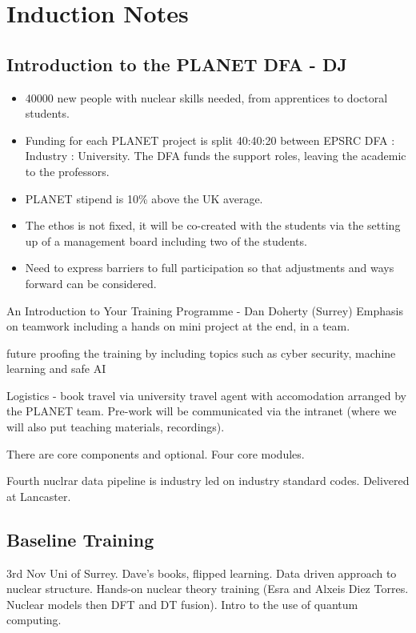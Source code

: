 \chapter{Induction Notes}
\section{Introduction to the PLANET DFA - DJ}
\begin{itemize}
    \item 40000 new people with nuclear skills needed, from apprentices to doctoral students.
    \item Funding for each PLANET project is split 40:40:20 between EPSRC DFA : Industry : University. The DFA funds the support roles, leaving the academic to the professors. 
    \item PLANET stipend is 10\% above the UK average.
    \item The ethos is not fixed, it will be co-created with the students via the setting up of a management board including two of the students. 
    \item Need to express barriers to full participation so that adjustments and ways forward can be considered. 
\end{itemize}


An Introduction to Your Training Programme - Dan Doherty (Surrey)
Emphasis on teamwork including a hands on mini project at the end, in a team. 

future proofing the training by including topics such as cyber security, machine learning and safe AI

Logistics - book travel via university travel agent with accomodation arranged by the PLANET team. Pre-work will be communicated via the intranet (where we will also put teaching materials, recordings). 

There are core components and optional. Four core modules. 


Fourth nuclrar data pipeline is industry led on industry standard codes. Delivered at Lancaster. 

\section{Baseline Training}
3rd Nov Uni of Surrey. Dave's books, flipped learning. Data driven approach to nuclear structure. Hands-on nuclear theory training (Esra and Alxeis Diez Torres. Nuclear models then DFT and DT fusion). Intro to the use of quantum computing. 

